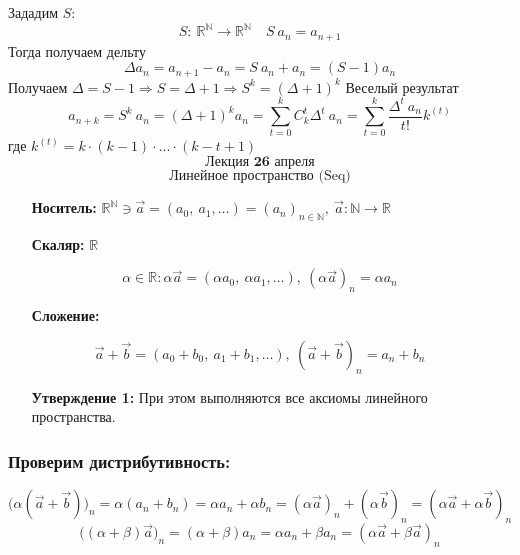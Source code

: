 \documentclass[12pt, letterpaper, twoside]{article}
\begin{document}
Зададим $S$:
$$S:\ \mathbb{R}^{\mathbb{N}}\rightarrow \mathbb{R}^{\mathbb{N}}\quad S\ a_n = a_{n+1}$$
Тогда получаем дельту
$$\Delta a_n = a_{n + 1} - a_n = S\ a_n + a_n = (S - 1) a_n$$
Получаем $\Delta = S - 1\Rightarrow S = \Delta + 1\Rightarrow S^k = (\Delta + 1)^k$
Веселый результат
$$a_{n + k} = S^k\ a_n = (\Delta + 1)^ka_n = \sum_{t = 0}^{k}C_{k}^{t}\Delta^t\ a_n = \sum_{t = 0}^{k}\dfrac{\Delta^t\ a_n}{t!}k^{(t)}$$
где $k^{(t)} = k\cdot (k - 1)\cdot \dots \cdot (k - t + 1)$
\[\textbf{Лекция 26 апреля}\]
\[\text{Линейное пространство (Seq)}\]
\begin{enumerate}
    \item[\textbf{Носитель:}] $\mathbb{R}^{\mathbb{N}}\owns \vec{a} = (a_0,\ a_1,\dots) = (a_n)_{n\in \mathbb{N}},\ \vec{a}: \mathbb{N}\longrightarrow \mathbb{R}$
\end{enumerate}
\begin{enumerate}
    \item[\textbf{Скаляр:}] $\mathbb{R}$
\end{enumerate}
\[\alpha \in \mathbb{R}: \alpha \vec{a} = (\alpha a_0,\ \alpha a_1,\dots),\ (\alpha \vec{a})_n = \alpha a_n\]
\begin{enumerate}
    \item[\textbf{Сложение:}]
\end{enumerate}
\[\vec{a} + \vec{b} = (a_0 + b_0,\ a_1 + b_1,\dots),\ (\vec{a} + \vec{b})_n = a_n + b_n\]
\begin{enumerate}
    \item[\textbf{Утверждение 1:}] При этом выполняются все аксиомы линейного пространства.
\end{enumerate}
\subsubsection*{Проверим дистрибутивность:}
\[\bigg(\alpha \left(\vec{a} + \vec{b}\right)\bigg)_n  =\alpha (a_n + b_n) = \alpha a_n + \alpha b_n = (\alpha \vec{a})_n + (\alpha \vec{b})_n = (\alpha \vec{a} + \alpha \vec{b})_n\]
\[\Big((\alpha + \beta) \vec{a}\Big)_n = (\alpha + \beta)a_n = \alpha a_n + \beta a_n = (\alpha \vec{a} + \beta \vec{a})_n\]
\end{document}
